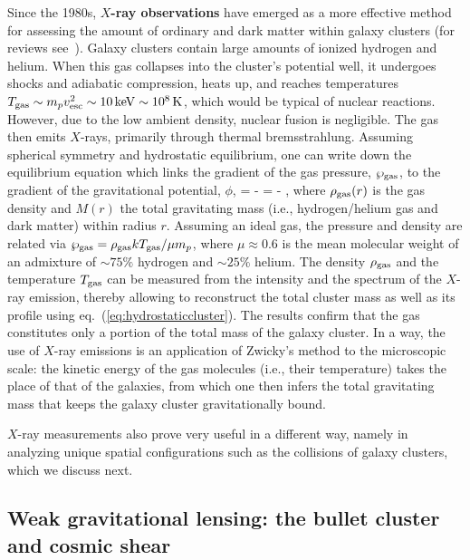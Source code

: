 Since the 1980s, {\bf $X$-ray observations} have emerged as a more effective method for assessing the amount of ordinary and dark matter within galaxy clusters 
(for reviews see~\cite{Xrayclusters}). 
Galaxy clusters contain large amounts of ionized hydrogen and helium. 
When this gas collapses into the cluster's potential well, it undergoes shocks and adiabatic compression, heats up, 
and reaches temperatures  $T_{\rm gas} \sim m_p v_{\rm esc}^2 \sim 10\,{\rm keV}\sim 10^8\,{\rm K}$, which would be typical of nuclear reactions.
However, due to the low ambient density, nuclear fusion is negligible.
The gas then emits $X$-rays, primarily through thermal bremsstrahlung. 
Assuming spherical symmetry and hydrostatic equilibrium, one can write down the equilibrium equation
which links the gradient of the gas pressure, $\wp_{\rm gas}$, to the gradient of the gravitational potential, $\phi$,
\beq
\label{eq:hydrostaticcluster}
 = -  = - ,
\eeq
where $\rho_{\rm gas}(r)$ is the gas density and $M(r)$ the total gravitating mass (i.e., hydrogen/helium gas and dark matter) within radius $r$. Assuming an ideal gas, the pressure and density are related via $\wp_{\rm gas} = \rho_{\rm gas} k T_{\rm gas}/\mu m_p$, where $\mu \approx 0.6$ is the mean molecular weight of an admixture of $\sim75\%$ hydrogen and $\sim25\%$ helium. The density $\rho_{\rm gas}$ and the temperature $T_{\rm gas}$ can be measured from the intensity and the spectrum of the $X$-ray emission, thereby allowing to reconstruct the total cluster mass as well as its profile using eq.~(\ref{eq:hydrostaticcluster}). The results confirm that the gas constitutes only a portion of the total mass of the galaxy cluster.
In a way, the use of $X$-ray emissions is an application of Zwicky's method to the microscopic scale:
 the kinetic energy  of the gas molecules (i.e., their temperature) takes the place of that of the galaxies, from which one then infers the total gravitating mass that keeps the galaxy cluster gravitationally bound. 

$X$-ray measurements also prove very useful in a different way, namely in analyzing unique spatial configurations such as the collisions of galaxy clusters, which we discuss next.




\subsection{Weak gravitational lensing: the bullet cluster and cosmic shear}
\label{sec:bullet}


